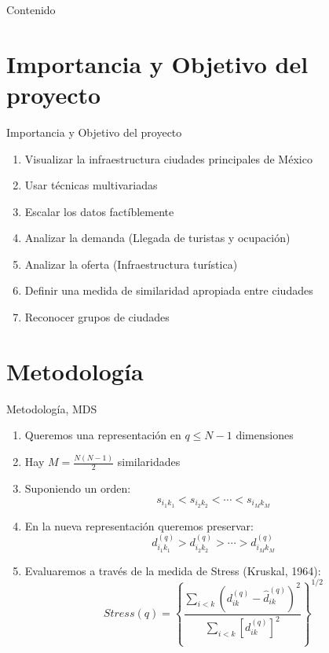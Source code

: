 

  \maketitle

\begin{frame}{Contenido}
	\tableofcontents
\end{frame}

\section{Importancia y Objetivo del proyecto}
\begin{frame}{Importancia y Objetivo del proyecto}
	
	\begin{enumerate}[<+- | alert@+>]
	    \item Visualizar la infraestructura ciudades principales de México
	    \item Usar técnicas multivariadas
	    \item Escalar los datos factíblemente
	    \item Analizar la demanda (Llegada de turistas y ocupación)
	    \item Analizar la oferta (Infraestructura turística)
	    \item Definir una medida de similaridad apropiada entre ciudades
	    \item Reconocer grupos de ciudades
	\end{enumerate}
\end{frame}
\section{Metodología}

\begin{frame}{Metodología, MDS}
	
	\begin{enumerate}
	[<+- | alert@+>]
	    \item Queremos una representación en $q\leq N - 1$ dimensiones
	    \item Hay $M = \frac{N(N-1)}{2}$ similaridades 
	    \item Suponiendo un orden:
	    $$
        s_{i_{1} k_{1}}<s_{i_{2} k_{2}}<\cdots<s_{i_{M} k_{M}}
        $$
        \item En la nueva representación queremos preservar:
        $$
d_{i_{1} k_{1}}^{(q)}>d_{i_{2} k_{2}}^{(q)}>\cdots>d_{i_Mk_M}^{(q)}
$$
\item Evaluaremos a través de la medida de Stress (Kruskal, 1964):
$$
Stress(q)=\left\{\frac{\sum_{i<k}\left(d_{i k}^{(q)}-\hat{d}_{i k}^{(q)}\right)^{2}}{\sum_{i<k}\left[d_{i k}^{(q)}\right]^{2}}\right\}^{1/2}
$$
	    
	\end{enumerate}
\end{frame}

